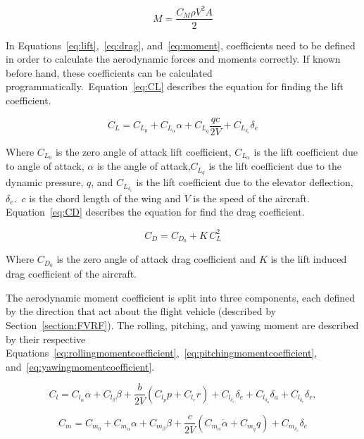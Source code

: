 \begin{equation}\label{eq:moment}
    M = \frac{C_M \rho V^2 A}{2}
\end{equation}

In Equations~\ref{eq:lift},~\ref{eq:drag}, and~\ref{eq:moment}, coefficients need to be defined in order to calculate the aerodynamic forces and moments correctly. If known before hand, these coefficients can be calculated programmatically.~Equation~\ref{eq:CL} describes the equation for finding the lift coefficient.

\begin{equation}\label{eq:CL}
    C_L = C_{L_0} + C_{L_\alpha}\alpha + C_{L_q}\frac{qc}{2V} + C_{L_{\delta_e}}\delta_e
\end{equation}

Where \(C_{L_0}\) is the zero angle of attack lift coefficient, \(C_{L_\alpha}\) is the lift coefficient due to angle of attack, \(\alpha \) is the angle of attack,\(C_{L_q}\) is the lift coefficient due to the dynamic pressure, \(q\), and \(C_{L_{\delta_e}}\) is the lift coefficient due to the elevator deflection, \(\delta_e\).~\(c\) is the chord length of the wing and \(V\) is the speed of the aircraft. Equation~\ref{eq:CD} describes the equation for find the drag coefficient.

\begin{equation}\label{eq:CD}
    C_D = C_{D_0} + K\,C_{L}^2
\end{equation}

Where \(C_{D_0}\) is the zero angle of attack drag coefficient and \(K\) is the lift induced drag coefficient of the aircraft.

The aerodynamic moment coefficient is split into three components, each defined by the direction that act about the flight vehicle (described by Section~\ref{section:FVRF}). The rolling, pitching, and yawing moment are described by their respective Equations~\ref{eq:rollingmomentcoefficient},~\ref{eq:pitchingmomentcoefficient}, and~\ref{eq:yawingmomentcoefficient}.

\begin{equation}\label{eq:rollingmomentcoefficient}
    C_l = C_{l_\alpha}\alpha + C_{l_\beta}\beta + \frac{b}{2V}\left(C_{l_p}p + C_{l_r}r\right) + C_{l_{\delta_e}}\delta_e + C_{l_{\delta_a}}\delta_a + C_{l_{\delta_r}}\delta_r,
\end{equation}

\begin{equation}\label{eq:pitchingmomentcoefficient}
    C_m = C_{m_0} + C_{m_\alpha}\alpha + C_{m_\beta}\beta + \frac{c}{2V}\left(C_{m_{\dot{\alpha}}}\dot{\alpha} + C_{m_q}q\right) + C_{m_{\delta_e}}\delta_e
\end{equation}

